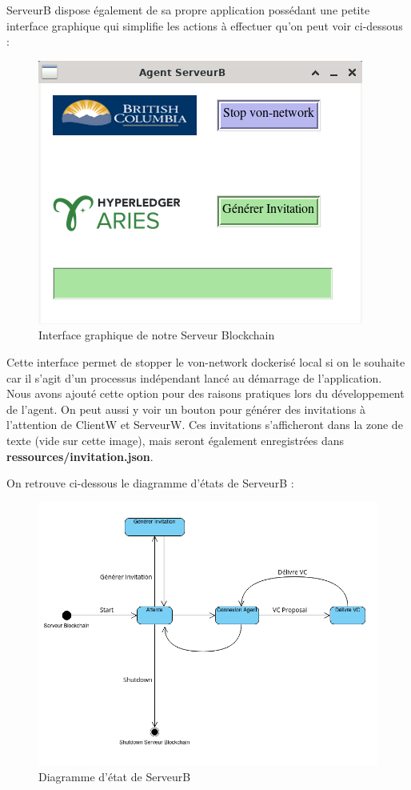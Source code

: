 \documentclass[12pt, openany]{report}
\begin{document}
\begin{flushleft}
ServeurB dispose également de sa propre application possédant une petite interface graphique qui simplifie les actions à effectuer qu'on peut voir ci-dessous : 

\begin{figure}[h]
\vspace{2mm}
\includegraphics[scale=0.7]{serveurB.png}
\centering
\caption{Interface graphique de notre Serveur Blockchain}
\end{figure}

Cette interface permet de stopper le von-network dockerisé local si on le souhaite car il s'agit d'un processus indépendant lancé au démarrage de l'application. Nous avons ajouté cette option pour des raisons pratiques lors du développement de l'agent. On peut aussi y voir un bouton pour générer des invitations à l'attention de ClientW et ServeurW. Ces invitations s'afficheront dans la zone de texte (vide sur cette image), mais seront également enregistrées dans \textbf{ressources/invitation.json}.

On retrouve ci-dessous le diagramme d'états de ServeurB :
\begin{figure}[H]
	\includegraphics[scale=0.5]{EtatServeurB.png}
	\centering
	\caption{Diagramme d'état de ServeurB}
\end{figure}

\end{flushleft}
\end{document}
